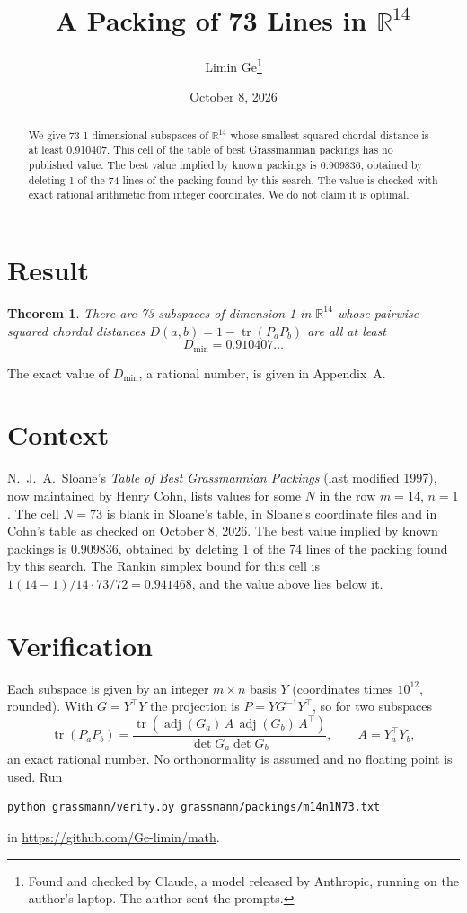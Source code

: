 \documentclass[11pt,a4paper]{article}
\title{A Packing of 73 Lines in $\mathbb{R}^{14}$}
\author{Limin Ge\thanks{Found and checked by Claude, a model released by Anthropic, running on the author's laptop. The author sent the prompts.}}
\date{October 8, 2026}
\newtheorem*{theorem}{Theorem}
\begin{document}
\maketitle
\begin{abstract}
We give 73 1-dimensional subspaces of $\mathbb{R}^{14}$ whose smallest squared chordal distance is at least 0.910407. This cell of the table of best Grassmannian packings has no published value. The best value implied by known packings is 0.909836, obtained by deleting 1 of the 74 lines of the packing found by this search. The value is checked with exact rational arithmetic from integer coordinates. We do not claim it is optimal.
\end{abstract}

\section{Result}
\begin{theorem}
There are 73 subspaces of dimension 1 in $\mathbb{R}^{14}$ whose pairwise squared chordal distances $D(a,b) = 1 - \operatorname{tr}(P_aP_b)$ are all at least
\[ D_{\min} = 0.910407\ldots \]
\end{theorem}
The exact value of $D_{\min}$, a rational number, is given in Appendix~A.


\section{Context}
N.~J.~A.~Sloane's \emph{Table of Best Grassmannian Packings} (last modified 1997), now maintained by Henry Cohn, lists values for some $N$ in the row $m=14$, $n=1$. The cell $N=73$ is blank in Sloane's table, in Sloane's coordinate files and in Cohn's table as checked on October 8, 2026. The best value implied by known packings is 0.909836, obtained by deleting 1 of the 74 lines of the packing found by this search. The Rankin simplex bound for this cell is $1(14-1)/14\cdot 73/72 = 0.941468$, and the value above lies below it.


\section{Verification}
Each subspace is given by an integer $m\times n$ basis $Y$ (coordinates times $10^{12}$, rounded). With $G=Y^\top Y$ the projection is $P=YG^{-1}Y^\top$, so for two subspaces
\[ \operatorname{tr}(P_aP_b)=\frac{\operatorname{tr}(\operatorname{adj}(G_a)\,A\,\operatorname{adj}(G_b)\,A^\top)}{\det G_a\det G_b},\qquad A=Y_a^\top Y_b, \]
an exact rational number. No orthonormality is assumed and no floating point is used. Run
\begin{verbatim}
python grassmann/verify.py grassmann/packings/m14n1N73.txt
\end{verbatim}
in \url{https://github.com/Ge-limin/math}.
\end{document}
